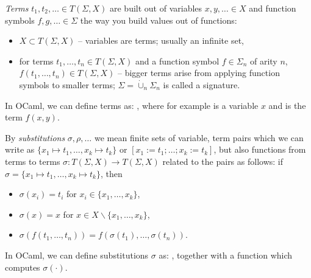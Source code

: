 \documentclass{article}
\newcommand{\assign}{:=}
\newcommand{\tmem}[1]{{\em #1\/}}
\begin{document}
\begin{exercise}
  {\tmem{Terms}} $t_1, t_2, \ldots \in T (\Sigma, X)$ are built out of
  variables $x, y, \ldots \in X$ and function symbols $f, g, \ldots \in
  \Sigma$ the way you build values out of functions:
  \begin{itemize}
    \item $X \subset T (\Sigma, X)$ -- variables are terms; usually an
    infinite set,
    
    \item for terms $t_1, \ldots, t_n \in T (\Sigma, X)$ and a function symbol
    $f \in \Sigma_n$ of arity $n$, $f (t_1, \ldots, t_n) \in T (\Sigma, X)$ --
    bigger terms arise from applying function symbols to smaller terms;
    $\Sigma = \dot{\cup}_n \Sigma_n$ is called a signature.
  \end{itemize}
  In OCaml, we can define terms as: {}{}{\hlopt{=
  }}{}{}{}{\hlopt{\textbar }}{}{}{}{\hlopt{* }}{}{\hspace*{\fill}}, where for example
  {}{\hlopt{(}}{}{\hlopt{)}} is a variable $x$ and
  {}{\hlopt{(}}{}{\hlopt{,
  [}}{}{\hlopt{(}}{}{\hlopt{);
  }}{}{\hlopt{(}}{}{\hlopt{)])}} is the term $f (x, y)$.
  
  By {\tmem{substitutions}} $\sigma, \rho, \ldots$ we mean finite sets of
  variable, term pairs which we can write as $\{ x_1 \mapsto t_1, \ldots, x_k
  \mapsto t_k \}$ or $[x_1 \assign t_1 ; \ldots ; x_k \assign t_k]$, but also
  functions from terms to terms $\sigma : T (\Sigma, X) \rightarrow T (\Sigma,
  X)$ related to the pairs as follows: if $\sigma = \{ x_1 \mapsto t_1,
  \ldots, x_k \mapsto t_k \}$, then
  \begin{itemize}
    \item $\sigma (x_i) = t_i$ for $x_i \in \{ x_1, \ldots, x_k \}$,
    
    \item $\sigma (x) = x$ for $x \in X\backslash \{ x_1, \ldots, x_k \}$,
    
    \item $\sigma (f (t_1, \ldots, t_n)) = f (\sigma (t_1), \ldots, \sigma
    (t_n))$.
  \end{itemize}
  In OCaml, we can define substitutions $\sigma$ as: {}{}{\hlopt{= (}}{}{\hlopt{*
  }}{}{\hlopt{) }}{}, together with a function
  {}{\hlopt{: }}{}{\hlopt{-> }}{}{\hlopt{-> }}{} which computes $\sigma (\cdot)$.
  

\end{exercise}
\end{document}
